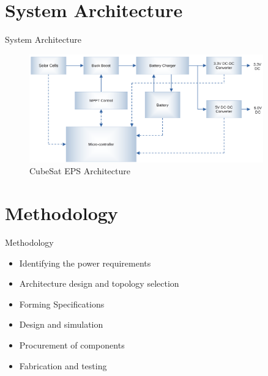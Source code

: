 \documentclass[aspectratio=169]{beamer}
\begin{document}
	
	\section{System Architecture}
	\begin{frame}{System Architecture}
		
		\begin{figure}[h]
			\centering
			\includegraphics[width=0.9\textwidth]{blk diag.png}
			\caption{CubeSat EPS Architecture}
			\label{fig:mesh1}
		\end{figure}
		
		
	\end{frame}
	
	\section{Methodology}
	
	
	
	
	
	
	\begin{frame}{Methodology}
		\begin{itemize}
			
			\item Identifying the power requirements
		\item Architecture design and topology selection
			\item Forming Specifications
			
			\item Design and simulation
			\item Procurement of components
			\item Fabrication and testing
			
		\end{itemize} 
		
	\end{frame}
	
	
\end{document}

